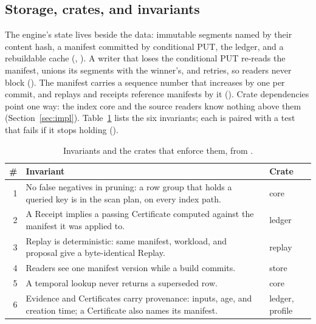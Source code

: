 \subsection{Storage, crates, and invariants}\label{sec:storage}

The engine's state lives beside the data: immutable segments named by their
content hash, a manifest committed by conditional PUT, the ledger, and a
rebuildable cache (, ). A writer that loses the
conditional PUT re-reads the manifest, unions its segments with the winner's,
and retries, so readers never block (). The manifest carries a
sequence number that increases by one per commit, and replays and receipts
reference manifests by it (). Crate dependencies point one way: the
index core and the source readers know nothing above them
(Section~\ref{sec:impl}). Table~\ref{tab:invariants} lists the six invariants;
each is paired with a test that fails if it stops holding
().

\begin{table}[t]
  \caption{Invariants and the crates that enforce them, from
    .}
  \label{tab:invariants}
  \small
  \begin{tabular}{@{}r>{\raggedright\arraybackslash}p{}l@{}}
    \toprule
    \# & Invariant & Crate \\
    \midrule
    1 & No false negatives in pruning: a row group that holds a queried key is
        in the scan plan, on every index path. & core \\
    2 & A Receipt implies a passing Certificate computed against the manifest
        it was applied to. & ledger \\
    3 & Replay is deterministic: same manifest, workload, and proposal give a
        byte-identical Replay. & replay \\
    4 & Readers see one manifest version while a build commits. & store \\
    5 & A temporal lookup never returns a superseded row. & core \\
    6 & Evidence and Certificates carry provenance: inputs, age, and creation
        time; a Certificate also names its manifest. & ledger, profile \\
    \bottomrule
  \end{tabular}
\end{table}
